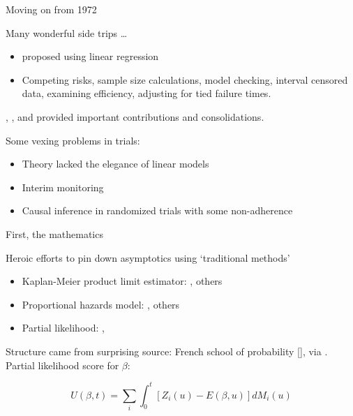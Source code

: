 \documentclass[11pt]{beamer}
\begin{document}
\begin{frame}{Moving on from 1972}
    
Many wonderful side trips \ldots    
    \begin{itemize}
        \item \cite{buckley1979linear} proposed using linear regression
        
        \item Competing risks, sample size calculations, model checking, interval censored data, examining efficiency, adjusting for tied failure times. %
        
        
    \end{itemize}
    
    
        
 \cite{kalbfleisch1980statistical}, \cite{Miller1981survival}, and \cite{cox1984analysis} provided  important contributions and consolidations.
 
\pause
 
 Some vexing problems in trials: 
 \begin{itemize}
        
        \item Theory lacked the elegance of linear models
        
        \item  Interim monitoring
            
        \item Causal inference in randomized trials with some non-adherence
            
    \end{itemize}
    
\end{frame}

\begin{frame}{First, the mathematics}
    
Heroic efforts to pin down asymptotics using `traditional methods'

\begin{itemize}
    \item Kaplan-Meier product limit estimator: \cite{breslow1974large}, others
    
    \item Proportional hazards model: \cite{tsiatis1981large}, others

    \item Partial likelihood: \cite{efron1977efficiency}, \cite{wong1986theory}
\end{itemize}

\pause

Structure came from surprising source: French school of probability [\cite{meyer1966probability}], via \cite{aalen1978nonparametric}.  Partial likelihood score for $\beta$:

\[
   U(\beta,t) = \sum_i \int_0^t [Z_i(u) - E(\beta, u)]dM_i(u)
\]
  
\end{frame}
\end{document}

